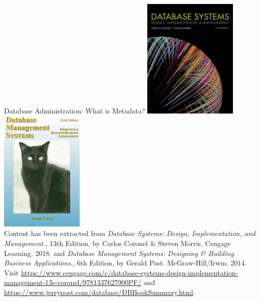 \documentclass{beamer}
\begin{document}
\begin{frame}{Database Administration: What is Metadata?}
    \centering
    \includegraphics[width=0.34\textwidth]{figures/book_cover2.jpg}
    \includegraphics[width=0.3\textwidth]{figures/book_cover3.jpg} \\
    \vspace{5mm}
    {
        \tiny
        Content has been extracted from \textit{Database Systems: Design, Implementation, and Management.}, 13th Edition, by Carlos Coronel \& Steven Morris. Cengage Learning. 2018. and \textit{Database Management Systems: Designing \& Building Business Applications.}, 6th Edition, by Gerald Post. McGraw-Hill/Irwin. 2014. \\
        Visit \url{https://www.cengage.com/c/database-systems-design-implementation-management-13e-coronel/9781337627900PF/} and \url{https://www.jerrypost.com/database/DBBookSummary.html}.\\
    }
\end{frame}
\end{document}

